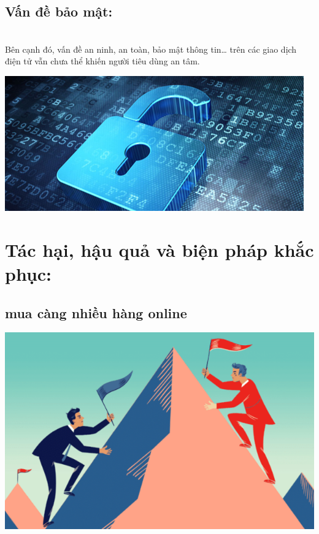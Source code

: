 \documentclass[13pt,a4paper]{article}
\begin{document}
    \subsection{Vấn đề bảo mật:}\\
    Bên cạnh đó, vấn đề an ninh, an toàn, bảo mật thông tin… trên các giao dịch điện tử vẫn chưa thể khiến người tiêu dùng an tâm.
    \begin{center}
    \includegraphics[scale=0.8]{images/khoa.png} \\
    \fontsize{10pt}{1.2pt}\selectfont
    \end{center}
    
\section{Tác hại, hậu quả và biện pháp khắc phục:}
\subsection{mua càng nhiều hàng online}
   \begin{center}
    \includegraphics[scale=0.8]{images/thach.png} \\
    \fontsize{10pt}{1.2pt}\selectfont
    \end{center}

	
	


\newpage
\end{document}
